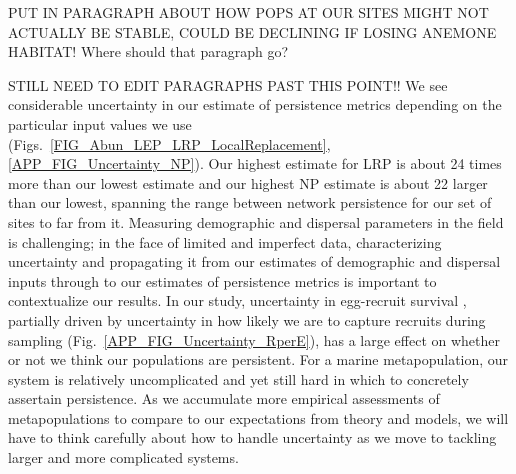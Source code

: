 \documentclass[12pt, oneside]{article}   	%
\begin{document}
PUT IN PARAGRAPH ABOUT HOW POPS AT OUR SITES MIGHT NOT ACTUALLY BE STABLE, COULD BE DECLINING IF LOSING ANEMONE HABITAT! Where should that paragraph go?

STILL NEED TO EDIT PARAGRAPHS PAST THIS POINT!!
We see considerable uncertainty in our estimate of persistence metrics depending on the particular input values we use (Figs.\ \ref{FIG_Abun_LEP_LRP_LocalReplacement}, \ref{APP_FIG_Uncertainty_NP}). Our highest estimate for LRP is about 24 times more than our lowest estimate and our highest NP estimate is about 22 larger than our lowest, spanning the range between network persistence for our set of sites to far from it. Measuring demographic and dispersal parameters in the field is challenging; in the face of limited and imperfect data, characterizing uncertainty and propagating it from our estimates of demographic and dispersal inputs through to our estimates of persistence metrics is important to contextualize our results. In our study, uncertainty in egg-recruit survival \citep[a commonly challenging parameter to estimate, e.g.][]{johnson2018integrating,hameed2016inverse}, partially driven by uncertainty in how likely we are to capture recruits during sampling (Fig.\ \ref{APP_FIG_Uncertainty_RperE}), has a large effect on whether or not we think our populations are persistent. For a marine metapopulation, our system is relatively uncomplicated and yet still hard in which to concretely assertain persistence. As we accumulate more empirical assessments of metapopulations to compare to our expectations from theory and models, we will have to think carefully about how to handle uncertainty as we move to tackling larger and more complicated systems. %
\end{document}

